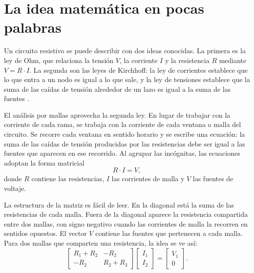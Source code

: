 \documentclass[journal]{IEEEtran}
\begin{document}
\section{La idea matemática en pocas palabras}
\label{sec:fundamento}

Un circuito resistivo se puede describir con dos ideas conocidas. La primera es la ley de Ohm, que relaciona la tensión $V$, la corriente $I$ y la resistencia $R$ mediante $V = R \cdot I$. La segunda son las leyes de Kirchhoff: la ley de corrientes establece que lo que entra a un nodo es igual a lo que sale, y la ley de tensiones establece que la suma de las caídas de tensión alrededor de un lazo es igual a la suma de las fuentes \cite{kirchhoff1847,nilsson2015}.

El análisis por mallas aprovecha la segunda ley. En lugar de trabajar con la corriente de cada rama, se trabaja con la corriente de cada ventana o malla del circuito. Se recorre cada ventana en sentido horario y se escribe una ecuación: la suma de las caídas de tensión producidas por las resistencias debe ser igual a las fuentes que aparecen en ese recorrido. Al agrupar las incógnitas, las ecuaciones adoptan la forma matricial
\begin{equation}
R \cdot I = V,
\label{eq:sistema}
\end{equation}
donde $R$ contiene las resistencias, $I$ las corrientes de malla y $V$ las fuentes de voltaje.

La estructura de la matriz es fácil de leer. En la diagonal está la suma de las resistencias de cada malla. Fuera de la diagonal aparece la resistencia compartida entre dos mallas, con signo negativo cuando las corrientes de malla la recorren en sentidos opuestos. El vector $V$ contiene las fuentes que pertenecen a cada malla. Para dos mallas que comparten una resistencia, la idea se ve así:
\begin{equation}
\begin{bmatrix}
R_1+R_2 & -R_2\\
-R_2 & R_2+R_3
\end{bmatrix}
\begin{bmatrix}
I_1\\
I_2
\end{bmatrix}
=
\begin{bmatrix}
V_1\\
0
\end{bmatrix}.
\label{eq:dos-mallas}
\end{equation}
\end{document}
